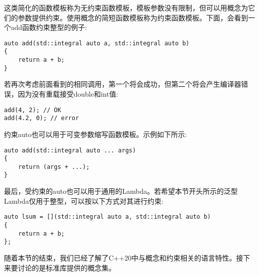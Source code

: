 这类简化的函数模板称为无约束函数模板，模板参数没有限制，但可以用概念为它们的参数提供约束。使用概念的简短函数模板称为约束函数模板。下面，会看到一个add函数约束整型的例子:

\begin{lstlisting}[style=styleCXX]
auto add(std::integral auto a, std::integral auto b)
{
	return a + b;
}
\end{lstlisting}

若再次考虑前面看到的相同调用，第一个将会成功，但第二个将会产生编译器错误，因为没有重载接受double和int值:

\begin{lstlisting}[style=styleCXX]
add(4, 2); // OK
add(4.2, 0); // error
\end{lstlisting}

约束auto也可以用于可变参数缩写函数模板。示例如下所示:

\begin{lstlisting}[style=styleCXX]
auto add(std::integral auto ... args)
{
	return (args + ...);
}
\end{lstlisting}

最后，受约束的auto也可以用于通用的Lambda。若希望本节开头所示的泛型Lambda仅用于整型，可以按以下方式对其进行约束:

\begin{lstlisting}[style=styleCXX]
auto lsum = [](std::integral auto a, std::integral auto b)
{
	return a + b;
};
\end{lstlisting}

随着本节的结束，我们已经了解了C++20中与概念和约束相关的语言特性。接下来要讨论的是标准库提供的概念集。






























